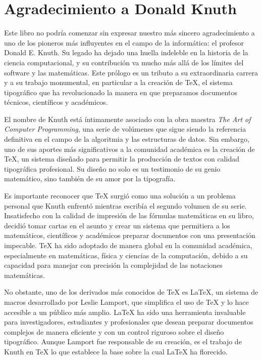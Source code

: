
\chapter{Agradecimiento a Donald Knuth}

Este libro no podría comenzar sin expresar nuestro más sincero agradecimiento a uno de los pioneros más influyentes en el campo de la informática: el profesor Donald E. Knuth. Su legado ha dejado una huella indeleble en la historia de la ciencia computacional, y su contribución va mucho más allá de los límites del software y las matemáticas. Este prólogo es un tributo a su extraordinaria carrera y a su trabajo monumental, en particular a la creación de \TeX{}, el sistema tipográfico que ha revolucionado la manera en que preparamos documentos técnicos, científicos y académicos.

El nombre de Knuth está íntimamente asociado con la obra maestra \textit{The Art of Computer Programming}, una serie de volúmenes que sigue siendo la referencia definitiva en el campo de la algoritmia y las estructuras de datos. Sin embargo, uno de sus aportes más significativos a la comunidad académica es la creación de \TeX{}, un sistema diseñado para permitir la producción de textos con calidad tipográfica profesional. Su diseño no solo es un testimonio de su genio matemático, sino también de su amor por la tipografía.

Es importante reconocer que \TeX{} surgió como una solución a un problema personal que Knuth enfrentó mientras escribía el segundo volumen de su serie. Insatisfecho con la calidad de impresión de las fórmulas matemáticas en su libro, decidió tomar cartas en el asunto y crear un sistema que permitiera a los matemáticos, científicos y académicos preparar documentos con una presentación impecable. \TeX{} ha sido adoptado de manera global en la comunidad académica, especialmente en matemáticas, física y ciencias de la computación, debido a su capacidad para manejar con precisión la complejidad de las notaciones matemáticas.

No obstante, uno de los derivados más conocidos de \TeX{} es \LaTeX{}, un sistema de macros desarrollado por Leslie Lamport, que simplifica el uso de \TeX{} y lo hace accesible a un público más amplio. \LaTeX{} ha sido una herramienta invaluable para investigadores, estudiantes y profesionales que desean preparar documentos complejos de manera eficiente y con un control riguroso sobre el diseño tipográfico. Aunque Lamport fue responsable de su creación, es el trabajo de Knuth en \TeX{} lo que establece la base sobre la cual \LaTeX{} ha florecido.


